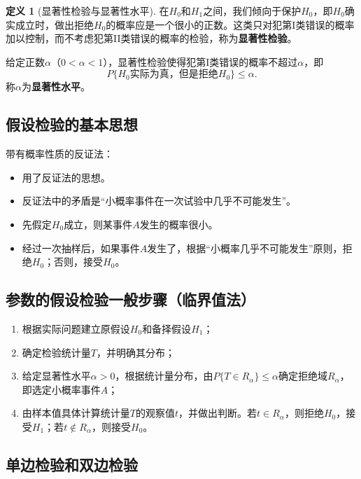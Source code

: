 \documentclass[11pt,a4paper]{report}
\theoremstyle{definition}
\newtheorem{definition}{定义}[chapter]
\theoremstyle{plain}
\begin{document}
\begin{definition}[显著性检验与显著性水平]
在$H_0$和$H_1$之间，我们倾向于保护$H_0$，即$H_0$确实成立时，做出拒绝$H_0$的概率应是一个很小的正数。这类只对犯第I类错误的概率加以控制，而不考虑犯第II类错误的概率的检验，称为\textbf{显著性检验}。

给定正数$\alpha$（$0<\alpha<1$），显著性检验使得犯第I类错误的概率不超过$\alpha$，即
\[
P\{H_0\text{实际为真，但是拒绝}H_0\}\leq\alpha.
\]
称$\alpha$为\textbf{显著性水平}。
\end{definition}

\subsection{假设检验的基本思想}

带有概率性质的反证法：
\begin{itemize}[leftmargin=2em]
    \item 用了反证法的思想。
    \item 反证法中的矛盾是“小概率事件在一次试验中几乎不可能发生”。
    \item 先假定$H_0$成立，则某事件$A$发生的概率很小。
    \item 经过一次抽样后，如果事件$A$发生了，根据“小概率几乎不可能发生”原则，拒绝$H_0$；否则，接受$H_0$。
\end{itemize}

\subsection{参数的假设检验一般步骤（临界值法）}

\begin{enumerate}[label=\arabic*.,leftmargin=2em]
    \item 根据实际问题建立原假设$H_0$和备择假设$H_1$；
    \item 确定检验统计量$T$，并明确其分布；
    \item 给定显著性水平$\alpha>0$，根据统计量分布，由$P\{T\in R_\alpha\}\leq\alpha$确定拒绝域$R_\alpha$，即选定小概率事件$A$；
    \item 由样本值具体计算统计量$T$的观察值$t$，并做出判断。若$t\in R_\alpha$，则拒绝$H_0$，接受$H_1$；若$t\notin R_\alpha$，则接受$H_0$。
\end{enumerate}

\subsection{单边检验和双边检验}
\end{document}
